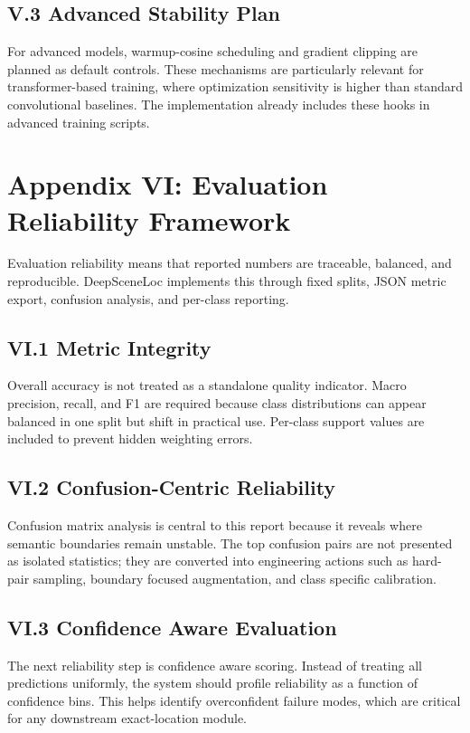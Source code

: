 \subsection*{V.3 Advanced Stability Plan}
For advanced models, warmup-cosine scheduling and gradient clipping are planned as default controls. These mechanisms are particularly relevant for transformer-based training, where optimization sensitivity is higher than standard convolutional baselines. The implementation already includes these hooks in advanced training scripts.

\section*{Appendix VI: Evaluation Reliability Framework}

Evaluation reliability means that reported numbers are traceable, balanced, and reproducible. DeepSceneLoc implements this through fixed splits, JSON metric export, confusion analysis, and per-class reporting.

\subsection*{VI.1 Metric Integrity}
Overall accuracy is not treated as a standalone quality indicator. Macro precision, recall, and F1 are required because class distributions can appear balanced in one split but shift in practical use. Per-class support values are included to prevent hidden weighting errors.

\subsection*{VI.2 Confusion-Centric Reliability}
Confusion matrix analysis is central to this report because it reveals where semantic boundaries remain unstable. The top confusion pairs are not presented as isolated statistics; they are converted into engineering actions such as hard-pair sampling, boundary focused augmentation, and class specific calibration.

\subsection*{VI.3 Confidence Aware Evaluation}
The next reliability step is confidence aware scoring. Instead of treating all predictions uniformly, the system should profile reliability as a function of confidence bins. This helps identify overconfident failure modes, which are critical for any downstream exact-location module.

